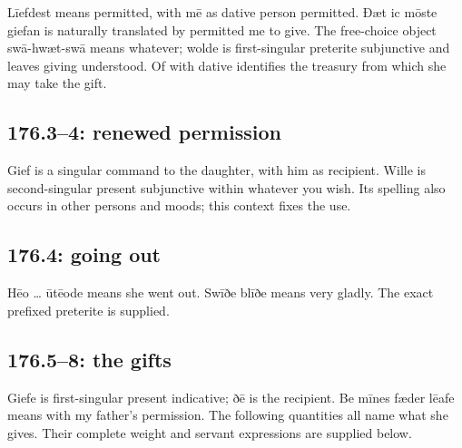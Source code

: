 Līefdest means permitted, with mē as dative person permitted. Ðæt ic mōste giefan is naturally translated by permitted me to give. The free-choice object swā-hwæt-swā means whatever; wolde is first-singular preterite subjunctive and leaves giving understood. Of with dative identifies the treasury from which she may take the gift.

\subsection*{176.3–4: renewed permission}

Gief is a singular command to the daughter, with him as recipient. Wille is second-singular present subjunctive within whatever you wish. Its spelling also occurs in other persons and moods; this context fixes the use.

\subsection*{176.4: going out}

Hēo … ūtēode means she went out. Swīðe blīðe means very gladly. The exact prefixed preterite is supplied.

\subsection*{176.5–8: the gifts}

Giefe is first-singular present indicative; ðē is the recipient. Be mīnes fæder lēafe means with my father’s permission. The following quantities all name what she gives. Their complete weight and servant expressions are supplied below.

